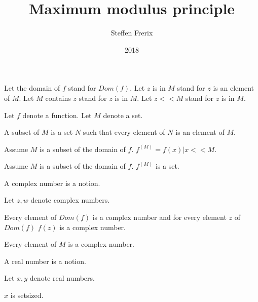 \documentclass{article}
\title{Maximum modulus principle}
\author{Steffen Frerix}
\date{2018}
\begin{document}

  \maketitle

  \begin{forthel}

    Let the domain of $f$ stand for $Dom(f)$.
    Let $z$ is in $M$ stand for $z$ is an element of $M$.
    Let $M$ contains $z$ stand for $z$ is in $M$.
    Let $z << M$ stand for $z$ is in $M$.

    Let $f$ denote a function.
    Let $M$ denote a set.

    \begin{definition}
      A subset of $M$ is a set $N$ such that every element of $N$ is an element of $M$.
    \end{definition}

    \begin{definition}
      Assume $M$ is a subset of the domain of $f$. $f^(M) = { f(x) | x << M }$.
    \end{definition}

    \begin{axiom}
      Assume $M$ is a subset of the domain of $f$. $f^(M)$ is a set.
    \end{axiom}

    \begin{signature}
      A complex number is a notion.
    \end{signature}

    Let $z,w$ denote complex numbers.

    \begin{axiom}
      Every element of $Dom(f)$ is a complex number and for every element $z$ of $Dom(f)$ $f(z)$ is a complex number.
    \end{axiom}

    \begin{axiom}
      Every element of $M$ is a complex number.
    \end{axiom}

    \begin{signature}
      A real number is a notion.
    \end{signature}

    Let $x,y$ denote real numbers.

    \begin{axiom}
      $x$ is setsized.
    \end{axiom}


\end{forthel}
\end{document}
